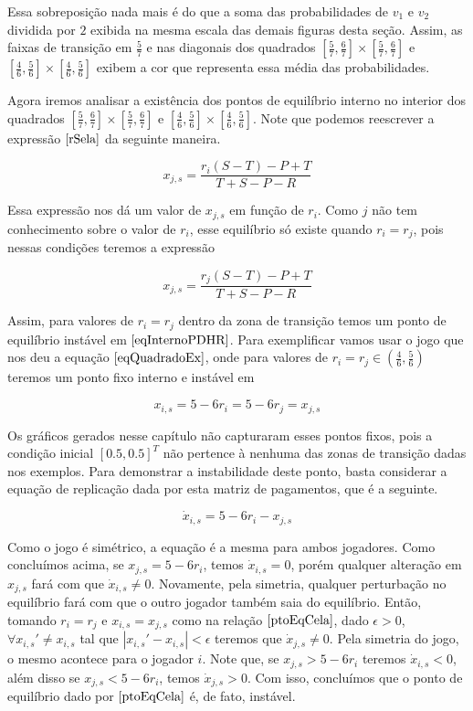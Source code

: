 Essa sobreposição nada mais é do que a soma das probabilidades de $v_1$ e $v_2$ dividida por $2$ exibida na mesma escala das demais figuras desta seção. Assim, as faixas de transição em $\frac{5}{7}$ e nas diagonais dos quadrados $[\frac{5}{7},\frac{6}{7}]\times[\frac{5}{7},\frac{6}{7}]$ e $[\frac{4}{6},\frac{5}{6}]\times[\frac{4}{6},\frac{5}{6}]$ exibem a cor que representa essa média das probabilidades.

Agora iremos analisar a existência dos pontos de equilíbrio interno no interior dos quadrados $[\frac{5}{7},\frac{6}{7}]\times[\frac{5}{7},\frac{6}{7}]$ e $[\frac{4}{6},\frac{5}{6}]\times[\frac{4}{6},\frac{5}{6}]$. Note que podemos reescrever a expressão $\eqref{rSela}$ da seguinte maneira.

\begin{equation}
    x_{j,s}=\frac{r_i(S-T)-P+T}{T+S-P-R}
\end{equation}

Essa expressão nos dá um valor de $x_{j,s}$ em função de $r_i$. Como $j$ não tem conhecimento sobre o valor de $r_i$, esse equilíbrio só existe quando $r_i=r_j$, pois nessas condições teremos a expressão

\begin{equation}
    \label{eqInternoPDHR}
    x_{j,s}=\frac{r_j(S-T)-P+T}{T+S-P-R}
\end{equation}

Assim, para valores de $r_i=r_j$ dentro da zona de transição temos um ponto de equilíbrio instável em $\eqref{eqInternoPDHR}$. Para exemplificar vamos usar o jogo que nos deu a equação $\eqref{eqQuadradoEx}$, onde para valores de $r_i=r_j\in(\frac{4}{6},\frac{5}{6})$ teremos um ponto fixo interno e instável em

\begin{equation}
    \label{ptoEqCela}
    x_{i,s}=5-6r_i=5-6r_j=x_{j,s}
\end{equation}

Os gráficos gerados nesse capítulo não capturaram esses pontos fixos, pois a condição inicial $[0.5,0.5]^T$ não pertence à nenhuma das zonas de transição dadas nos exemplos. Para demonstrar a instabilidade deste ponto, basta considerar a equação de replicação dada por esta matriz de pagamentos, que é a seguinte.

\begin{equation}
    \dot{x}_{i,s}= 5-6r_i - x_{j,s}
\end{equation}

Como o jogo é simétrico, a equação é a mesma para ambos jogadores. Como concluímos acima, se $x_{j,s}=5-6r_i$, temos $\dot{x}_{i,s}=0$, porém qualquer alteração em $x_{j,s}$ fará com que $\dot{x}_{i,s}\neq 0$. Novamente, pela simetria, qualquer perturbação no equilíbrio fará com que o outro jogador também saia do equilíbrio. Então, tomando $r_i=r_j$ e $x_{i,s}=x_{j,s}$ como na relação $\eqref{ptoEqCela}$, dado $\epsilon>0$, $\forall x_{i,s}'\neq x_{i,s}$ tal que $|x_{i,s}'-x_{i,s}|<\epsilon$ teremos que $\dot{x}_{j,s}\neq 0$. Pela simetria do jogo, o mesmo acontece para o jogador $i$. Note que, se $x_{j,s}>5-6r_i$ teremos $\dot{x}_{i,s}<0$, além disso se $x_{j,s}<5-6r_i$, temos $\dot{x}_{j,s}>0$. Com isso, concluímos que o ponto de equilíbrio dado por $\eqref{ptoEqCela}$ é, de fato, instável.